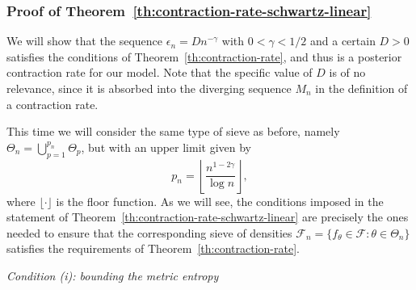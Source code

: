 \subsubsection*{Proof of Theorem~\ref{th:contraction-rate-schwartz-linear}}

We will show that the sequence \(\epsilon_n=Dn^{-\gamma}\) with \(0<\gamma<1/2\) and a certain \(D>0\) satisfies the conditions of Theorem~\ref{th:contraction-rate}, and thus is a posterior contraction rate for our model. Note that the specific value of \(D\) is of no relevance, since it is absorbed into the diverging sequence \(M_n\) in the definition of a contraction rate.

This time we will consider the same type of sieve as before, namely \(\Theta_n = \bigcup_{p=1}^{p_n}\Theta_p\), but with an upper limit given by
\[
  p_n=\left\lfloor\frac{n^{1-2\gamma}}{\log n}\right\rfloor,
\]
where \(\lfloor \cdot \rfloor\) is the floor function. As we will see, the conditions imposed in the statement of Theorem~\ref{th:contraction-rate-schwartz-linear} are precisely the ones needed to ensure that the corresponding sieve of densities \(\mathcal F_n=\{f_\theta\in\mathcal F: \theta \in \Theta_n\}\) satisfies the requirements of Theorem~\ref{th:contraction-rate}.

\noindent\textit{Condition (i): bounding the metric entropy}

